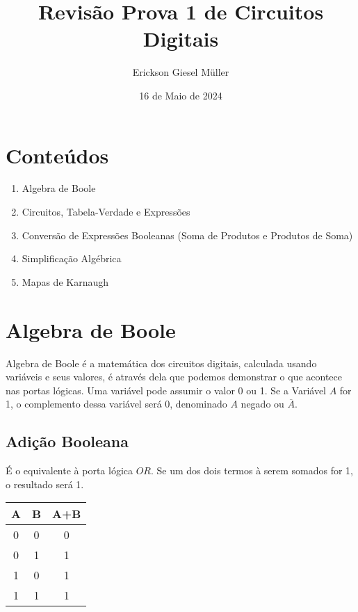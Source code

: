 \documentclass{article}
\title{Revisão Prova 1 de Circuitos Digitais}
\author{Erickson Giesel Müller}
\date{16 de Maio de 2024}
\begin{document}
	\maketitle
	\section{Conteúdos}
		\begin{enumerate}
			\item Algebra de Boole
			\item Circuitos, Tabela-Verdade e Expressões
			\item Conversão de Expressões Booleanas (Soma de Produtos e Produtos de Soma)
			\item Simplificação Algébrica
			\item Mapas de Karnaugh
		\end{enumerate}
		
	\section{Algebra de Boole}
	
		Algebra de Boole é a matemática dos circuitos digitais, calculada usando variáveis e seus valores, é através dela que podemos demonstrar o que acontece nas portas lógicas. Uma variável pode assumir o valor 0 ou 1. Se a Variável $A$ for 1, o complemento dessa variável será 0, denominado $A$ negado ou $\overline{A}$.
		\subsection{Adição Booleana}
			É o equivalente à porta lógica $OR$. Se um dos dois termos à serem somados for 1, o resultado será 1.\\
				\hspace*{4 cm}
				\begin{tabular}{|c|c|c|}
					\hline
					A & B & A+B \\
					\hline
					0 & 0 & 0 \\
					\hline
					0 & 1 & 1 \\
					\hline
					1 & 0 & 1 \\
					\hline
					1 & 1 & 1 \\
					\hline
				\end{tabular}
				
\end{document}

